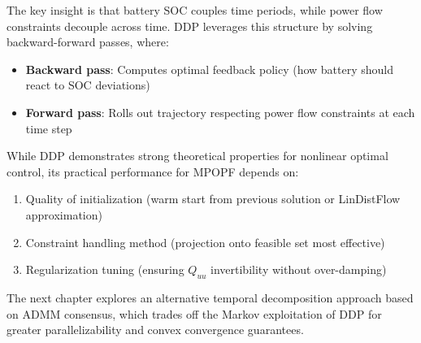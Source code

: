 The key insight is that battery SOC couples time periods, while power flow constraints decouple across time. DDP leverages this structure by solving backward-forward passes, where:
\begin{itemize}
    \item \textbf{Backward pass}: Computes optimal feedback policy (how battery should react to SOC deviations)
    \item \textbf{Forward pass}: Rolls out trajectory respecting power flow constraints at each time step
\end{itemize}

While DDP demonstrates strong theoretical properties for nonlinear optimal control, its practical performance for MPOPF depends on:
\begin{enumerate}
    \item Quality of initialization (warm start from previous solution or LinDistFlow approximation)
    \item Constraint handling method (projection onto feasible set most effective)
    \item Regularization tuning (ensuring $Q_{uu}$ invertibility without over-damping)
\end{enumerate}

The next chapter explores an alternative temporal decomposition approach based on ADMM consensus, which trades off the Markov exploitation of DDP for greater parallelizability and convex convergence guarantees.
